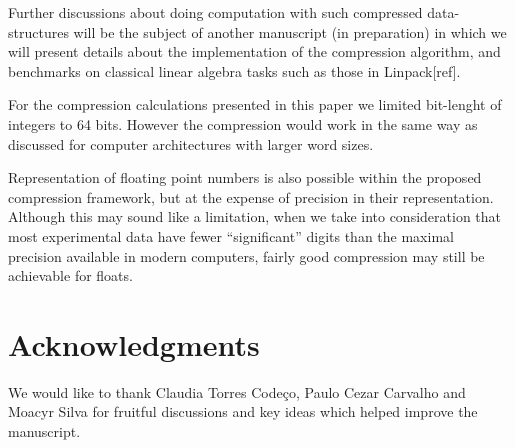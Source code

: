\documentclass[10pt]{article}
\begin{document}
Further discussions about doing computation with such compressed data-structures will be the subject of another manuscript (in preparation) in which we will present details about the implementation of the compression algorithm, and benchmarks on classical linear algebra tasks such as those in Linpack[ref].

For the compression calculations presented in this paper we limited bit-lenght of integers to 64 bits. However the compression would work in the same way as discussed for computer architectures with larger word sizes.

Representation of floating point numbers is also possible within the proposed compression framework, but at the expense of precision in their representation. Although this may sound like a limitation, when we take into consideration that most experimental data have fewer ``significant'' digits than the maximal precision available in modern computers, fairly good compression may still be achievable for floats.



\section*{Acknowledgments}
We would like to thank Claudia Torres Code\c{c}o, Paulo Cezar Carvalho and Moacyr Silva for fruitful discussions and key ideas which helped improve the manuscript.





\end{document}
